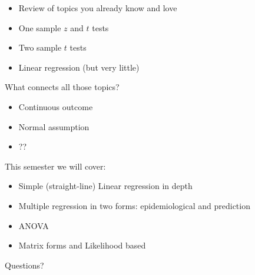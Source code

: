 \documentclass[handout,x11names,unknownkeysallowed]{beamer}
\makeatletter
\newcommand{\beamitem}{\begin{itemize}[<+-|alert@+>]}
\makeatother
\begin{document}
\begin{frame}
\beamitem
\item Review of topics you already know and love
\item One sample $z$ and $t$ tests
\item Two sample $t$ tests
\item Linear regression (but very little)
\end{itemize}
\end{frame}

\begin{frame}
What connects all those topics?
\beamitem
\item Continuous outcome
\item Normal assumption
\item ??
\end{itemize}
\end{frame}

\begin{frame}
This semester we will cover:
\beamitem
\item Simple (straight-line) Linear regression in depth
\item Multiple regression in two forms: epidemiological and prediction
\item ANOVA 
\item Matrix forms and Likelihood based
\end{itemize}
\end{frame}

\begin{frame}
\begin{center}
Questions?
\end{center}

\end{frame}
\end{document}
